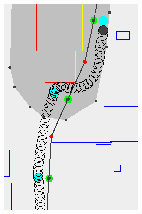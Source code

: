 \begin{figure}[h]
\begin{subfigure}[t]{0.30\columnwidth}
        		\includegraphics[width=\textwidth]{img/transition-suboptimal-post}
        		\caption{}
        		 \label{fig:transition-suboptimal-post}
	\end{subfigure}	
		\hfill
	\begin{subfigure}[t]{0.30\columnwidth}

\end{subfigure}
\end{figure}

